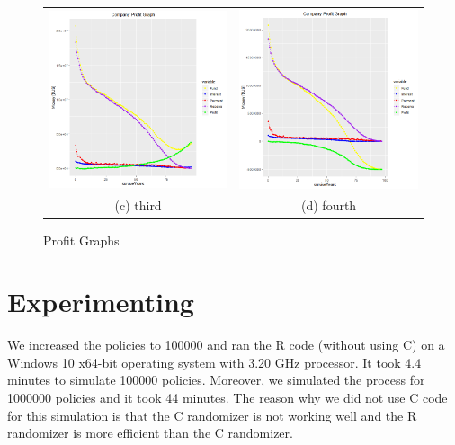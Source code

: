 \documentclass[12pt]{article}
\begin{document}
\begin{figure}[h]
\begin{tabular}{cc}
		\includegraphics[width=65mm]{profit2.PNG} &   \includegraphics[width=65mm]{profit3.PNG} \\
		(c) third & (d) fourth \\[6pt]

	\end{tabular}
	\caption{Profit Graphs}
\end{figure}

\newpage
\section{Experimenting}
We increased the policies to 100000 and ran the R code (without using C) on a Windows 10 x64-bit operating system with 3.20 GHz processor. It took 4.4 minutes to simulate 100000 policies. Moreover, we simulated the process for 1000000 policies and it took 44 minutes. The reason why we did not use C code for this simulation is that the C randomizer is not working well and the R randomizer is more efficient than the C randomizer.
\end{document}
